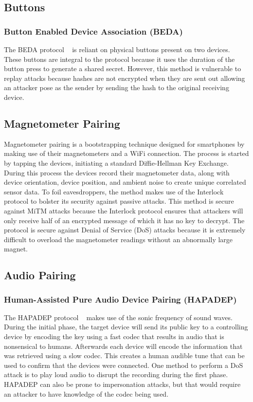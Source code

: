 \subsection{Buttons}
\subsubsection{Button Enabled Device Association (BEDA)}
The BEDA protocol ~\cite{soriente2007beda} is reliant on physical buttons present on two devices.
These buttons are integral to the protocol because it uses the duration of the button press to generate a shared secret.
However, this method is vulnerable to replay attacks because hashes are not encrypted when they are sent out allowing an attacker pose as the sender by sending the hash to the original receiving device.

\subsection{Magnetometer Pairing}
Magnetometer pairing is a bootstrapping technique designed for smartphones by making use of their magnetometers and a WiFi connection.
The process is started by tapping the devices, initiating a standard Diffie-Hellman Key Exchange.
During this process the devices record their magnetometer data, along with device orientation, device position, and ambient noise to create unique correlated sensor data.
To foil eavesdroppers, the method makes use of the Interlock protocol to bolster its security against passive attacks.
This method is secure against MiTM attacks because the Interlock protocol ensures that attackers will only receive half of an encrypted message of which it has no key to decrypt.
The protocol is secure against Denial of Service (DoS) attacks because it is extremely difficult to overload the magnetometer readings without an abnormally large magnet.

\subsection{Audio Pairing}
\subsubsection{Human-Assisted Pure Audio Device Pairing (HAPADEP)}
The HAPADEP protocol ~\cite{soriente2008hapadep} makes use of the sonic frequency of sound waves. During the initial phase, the target device will send its public key to a controlling device by encoding the key using a fast codec that results in audio that is nonsensical to humans. Afterwards each device will encode the information that was retrieved using a slow codec. This creates a human audible tune that can be used to confirm that the devices were connected. One method to perform a DoS attack is to play loud audio to disrupt the recording during the first phase. HAPADEP can also be prone to impersonation attacks, but that would require an attacker to have knowledge of the codec being used. 

